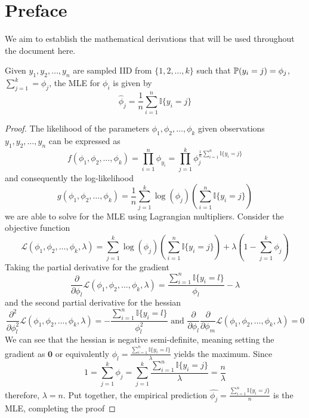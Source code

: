 \section*{Preface}
We aim to establish the mathematical derivations that will be used throughout the document here.
\begin{theorem}
    Given $y_1,y_2,\dots,y_n$ are sampled IID from $\{1,2,\dots,k\}$ such that $\mathbb{P}(y_i=j)=\phi_j$, $\sum_{j=1}^k=\phi_j$, the MLE for $\phi_i$ is given by
    \[
        \hat{\phi}_j = \frac{1}{n} \sum_{i=1}^n \mathbb{I}\{y_i=j\}
    \]
\end{theorem}
\begin{proof}
    The likelihood of the parameters $\phi_1,\phi_2,\dots,\phi_k$ given observations $y_1,y_2,\dots,y_n$ can be expressed as
    \[
    f(\phi_1,\phi_2,\dots,\phi_k) = \prod_{i=1}^n \phi_{y_i} = \prod_{j=1}^k \phi_{j} ^ {\frac{1}{n} \sum_{i=1}^n \mathbb{I}\{y_i=j\}}
    \]
    and consequently the log-likelihood
    \[
    g(\phi_1,\phi_2,\dots,\phi_k) = \frac{1}{n} \sum_{j=1}^k \log(\phi_{j}) \left(\sum_{i=1}^n \mathbb{I}\{y_i=j\}\right)
    \]
    we are able to solve for the MLE using Lagrangian multipliers. Consider the objective function 
    \[
    \mathcal{L}(\phi_1,\phi_2,\dots,\phi_k,\lambda) = \sum_{j=1}^k \log(\phi_{j}) \left(\sum_{i=1}^n \mathbb{I}\{y_i=j\}\right) + \lambda\left(1-\sum_{j=1}^k\phi_j\right)
    \]
    Taking the partial derivative for the gradient
    \[
    \frac{\partial}{\partial \phi_l} \mathcal{L}(\phi_1,\phi_2,\dots,\phi_k,\lambda) = \frac{\sum_{i=1}^n \mathbb{I}\{y_i=l\}}{\phi_l} - \lambda
    \]
    and the second partial derivative for the hessian
    \[
        \frac{\partial^2}{\partial \phi_l^2} \mathcal{L}(\phi_1,\phi_2,\dots,\phi_k,\lambda) = -\frac{\sum_{i=1}^n \mathbb{I}\{y_i=l\}}{\phi_l^2}
        \text{ and }
        \frac{\partial}{\partial \phi_l}\frac{\partial}{\partial \phi_m}\mathcal{L}(\phi_1,\phi_2,\dots,\phi_k,\lambda) = 0
    \]
    We can see that the hessian is negative semi-definite, meaning setting the gradient as $\mathbf{0}$ or equivalently $\phi_l=\frac{\sum_{i=1}^n \mathbb{I}\{y_i=l\}}{\lambda}$ yields the maximum. Since
    \[
        1 = \sum_{j=1}^k\phi_j = \sum_{j=1}^k \frac{\sum_{i=1}^n \mathbb{I}\{y_i=j\}}{\lambda} = \frac{n}{\lambda}
    \]
    therefore, $\lambda=n$. Put together, the empirical prediction $\hat{\phi_j} = \frac{\sum_{i=1}^n \mathbb{I}\{y_i=j\}}{n}$ is the MLE, completing the proof
\end{proof}

